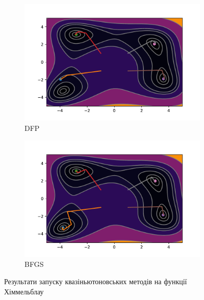 \begin{figure}
    \ContinuedFloat
    \begin{subfigure}{0.5\textwidth}
        \includegraphics[width=\textwidth, trim=1.4cm 0.5cm 1.3cm 1cm, clip]{assets/DFP/himmelblau.pdf}
        \caption{DFP}
    \end{subfigure}
    \begin{subfigure}{0.5\textwidth}
        \includegraphics[width=\textwidth, trim=1.4cm 0.5cm 1.3cm 1cm, clip]{assets/BFGS/himmelblau.pdf}
        \caption{BFGS}
    \end{subfigure}
    \caption{Результати запуску квазіньютоновських методів на функції Хіммельблау}
\end{figure}

